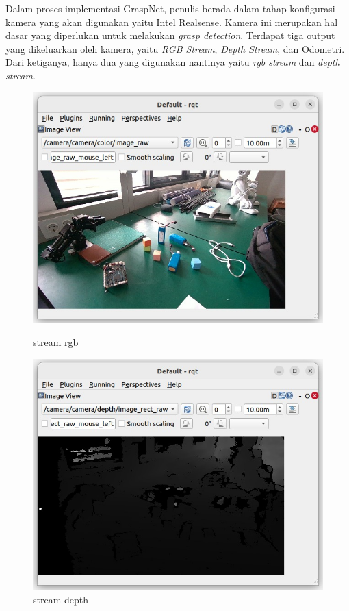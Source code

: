 Dalam proses implementasi GraspNet, penulis berada dalam tahap konfigurasi kamera yang akan digunakan yaitu Intel Realsense.
Kamera ini merupakan hal dasar yang diperlukan untuk melakukan \emph{grasp detection}. Terdapat tiga output yang dikeluarkan oleh kamera,
yaitu \emph{RGB Stream}, \emph{Depth Stream}, dan Odometri. Dari ketiganya, hanya dua yang digunakan nantinya yaitu \emph{rgb stream}
dan \emph{depth stream}.
\begin{figure}[h]
    \centering
    \begin{minipage}{0.48\columnwidth}
        \centering
        \includegraphics[width=\linewidth]{gambar/rgb stream.jpeg}
        \caption{stream rgb}
        \label{fig:rgb_stream}
    \end{minipage}
    \hfill
    \begin{minipage}{0.48\columnwidth}
        \centering
        \includegraphics[width=\linewidth]{gambar/depth stream.jpeg}
        \caption{stream depth}
        \label{fig:depth_stream}
    \end{minipage}
\end{figure}
